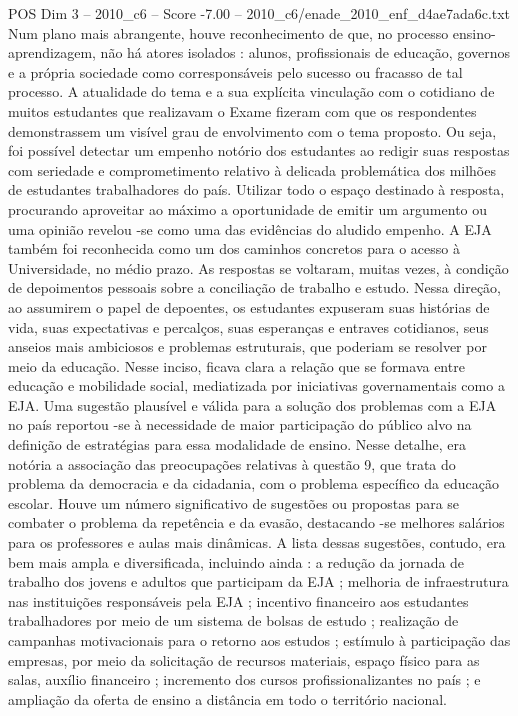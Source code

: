 \begin{textsample}{POS Dim 3 – 2010\_c6 – Score -7.00 – 2010\_c6/enade\_2010\_enf\_d4ae7ada6c.txt}
Num plano mais abrangente, houve reconhecimento de que, no processo ensino-aprendizagem, não há atores isolados : alunos, profissionais de educação, governos e a própria sociedade como corresponsáveis pelo sucesso ou fracasso de tal processo.
A atualidade do tema e a sua explícita vinculação com o cotidiano de muitos estudantes que realizavam o Exame fizeram com que os respondentes demonstrassem um visível grau de envolvimento com o tema proposto.
Ou seja, foi possível detectar um empenho notório dos estudantes ao redigir suas respostas com seriedade e comprometimento relativo à delicada problemática dos milhões de estudantes trabalhadores do país.
Utilizar todo o espaço destinado à resposta, procurando aproveitar ao máximo a oportunidade de emitir um argumento ou uma opinião revelou -se como uma das evidências do aludido empenho.
A EJA também foi reconhecida como um dos caminhos concretos para o acesso à Universidade, no médio prazo.
As respostas se voltaram, muitas vezes, à condição de depoimentos pessoais sobre a conciliação de trabalho e estudo.
Nessa direção, ao assumirem o papel de depoentes, os estudantes expuseram suas histórias de vida, suas expectativas e percalços, suas esperanças e entraves cotidianos, seus anseios mais ambiciosos e problemas estruturais, que poderiam se resolver por meio da educação.
Nesse inciso, ficava clara a relação que se formava entre educação e mobilidade social, mediatizada por iniciativas governamentais como a EJA.
Uma sugestão plausível e válida para a solução dos problemas com a EJA no país reportou -se à necessidade de maior participação do público alvo na definição de estratégias para essa modalidade de ensino.
Nesse detalhe, era notória a associação das preocupações relativas à questão 9, que trata do problema da democracia e da cidadania, com o problema específico da educação escolar.
Houve um número significativo de sugestões ou propostas para se combater o problema da repetência e da evasão, destacando -se melhores salários para os professores e aulas mais dinâmicas.
A lista dessas sugestões, contudo, era bem mais ampla e diversificada, incluindo ainda : a redução da jornada de trabalho dos jovens e adultos que participam da EJA ; melhoria de infraestrutura nas instituições responsáveis pela EJA ; incentivo financeiro aos estudantes trabalhadores por meio de um sistema de bolsas de estudo ; realização de campanhas motivacionais para o retorno aos estudos ; estímulo à participação das empresas, por meio da solicitação de recursos materiais, espaço físico para as salas, auxílio financeiro ; incremento dos cursos profissionalizantes no país ; e ampliação da oferta de ensino a distância em todo o território nacional.

\end{textsample}
